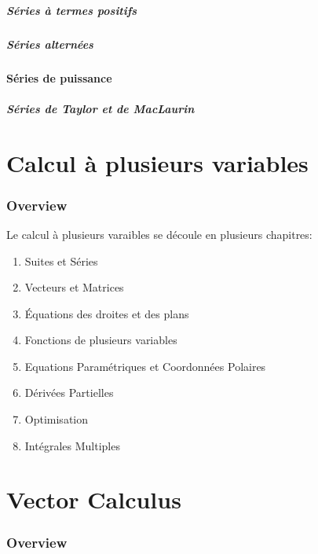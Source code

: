 \documentclass{article}
\begin{document}
\subsubsection{Séries à termes positifs}
\subsubsection{Séries alternées}
\subsection{Séries de puissance}
\subsubsection{Séries de Taylor et de MacLaurin}

\pagebreak

\part{Calcul à plusieurs variables}
\section{Overview}

Le calcul à plusieurs varaibles se découle en plusieurs chapitres:

\begin{enumerate}
    \item Suites et Séries
    \item Vecteurs et Matrices
    \item Équations des droites et des plans
    \item Fonctions de plusieurs variables
    \item Equations Paramétriques et Coordonnées Polaires
    \item Dérivées Partielles
    \item Optimisation
    \item Intégrales Multiples
\end{enumerate}
\pagebreak

\part{Vector Calculus}
\section{Overview}
\pagebreak
\end{document}
